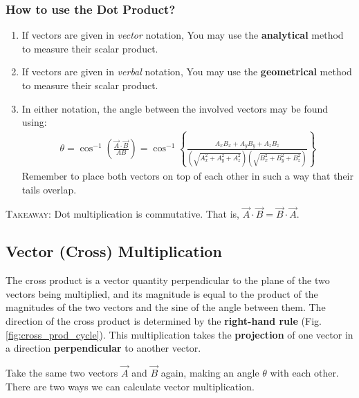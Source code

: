 \documentclass[12pt,b4paper]{article}
\begin{document}
\subsubsection*{How to use the Dot Product?}
\begin{enumerate}
    \item If vectors are given in \textit{vector} notation, You may use the \textbf{analytical} method to measure their scalar product.
    \item If vectors are given in \textit{verbal} notation, You may use the \textbf{geometrical} method to measure their scalar product.
    \item In either notation, the angle between the involved vectors may be found using:
    \begin{align}
        \theta=\cos^{-1}\left(\frac{\Vec{A}\cdot\Vec{B}}{AB}\right)=\cos^{-1}\left\{\frac{A_xB_x + A_yB_y + A_zB_z}{\left(\sqrt{A_x^2+A_y^2+A_z^2}\right)\left(\sqrt{B_x^2+B_y^2+B_z^2}\right)}\right\}
    \end{align}
    Remember to place both vectors on top of each other in such a way that their tails overlap.
\end{enumerate}
\textsc{Takeaway}: Dot multiplication is commutative. That is, $\Vec{A}\cdot\Vec{B}=\Vec{B}\cdot\Vec{A}$.
\subsection*{Vector (Cross) Multiplication}
The cross product is a vector quantity perpendicular to the plane of the two vectors being multiplied, and its magnitude is equal to the product of the magnitudes of the two vectors and the sine of the angle between them. The direction of the cross product is determined by the \textbf{right-hand rule} (Fig. \ref{fig:cross_prod_cycle}). This multiplication takes the \textbf{projection} of one vector in a direction \textbf{perpendicular} to another vector.

Take the same two vectors $\Vec{A}$ and $\Vec{B}$ again, making an angle $\theta$ with each other. There are two ways we can calculate vector multiplication.
\end{document}

